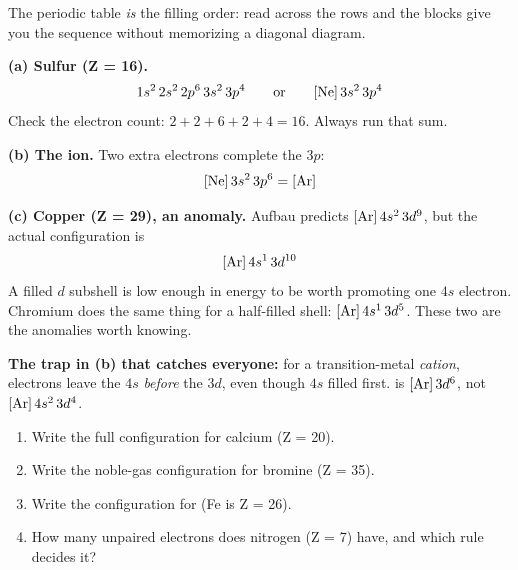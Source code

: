 \documentclass{apchem-worksheet}
\begin{document}
The periodic table \emph{is} the filling order: read across the rows and
the blocks give you the sequence without memorizing a diagonal diagram.

\begin{workedexample}
\textbf{(a) Sulfur (Z = 16).}
\[ 1s^{2}\,2s^{2}\,2p^{6}\,3s^{2}\,3p^{4}
   \qquad\text{or}\qquad [\ce{Ne}]\,3s^{2}\,3p^{4} \]
Check the electron count: $2+2+6+2+4 = 16$. Always run that sum.

\textbf{(b) The  ion.} Two extra electrons complete the $3p$:
\[ [\ce{Ne}]\,3s^{2}\,3p^{6} = [\ce{Ar}] \]

\textbf{(c) Copper (Z = 29), an anomaly.} Aufbau predicts
$[\ce{Ar}]\,4s^{2}\,3d^{9}$, but the actual configuration is
\[ [\ce{Ar}]\,4s^{1}\,3d^{10} \]
A filled $d$ subshell is low enough in energy to be worth promoting one
$4s$ electron. Chromium does the same thing for a half-filled shell:
$[\ce{Ar}]\,4s^{1}\,3d^{5}$. These two are the anomalies worth knowing.

\textbf{The trap in (b) that catches everyone:} for a transition-metal
\emph{cation}, electrons leave the $4s$ \emph{before} the $3d$, even
though $4s$ filled first.  is $[\ce{Ar}]\,3d^{6}$, not
$[\ce{Ar}]\,4s^{2}\,3d^{4}$.
\end{workedexample}

\begin{yourturn}
\begin{enumerate}[leftmargin=*,itemsep=0.5em]
  \item Write the full configuration for calcium (Z = 20).
        \workspace[1.6cm]
  \item Write the noble-gas configuration for bromine (Z = 35).
        \workspace[1.6cm]
  \item Write the configuration for  (Fe is Z = 26).
        \workspace[1.6cm]
  \item How many unpaired electrons does nitrogen (Z = 7) have, and
        which rule decides it? \workspace[1.6cm]
\end{enumerate}
\end{yourturn}
\end{document}
